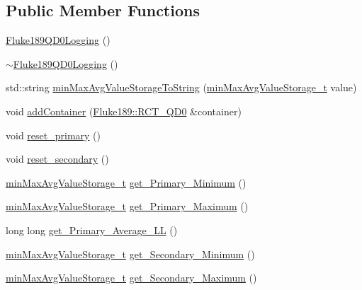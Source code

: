 \subsection*{Public Member Functions}
\begin{DoxyCompactItemize}
\item 
\hyperlink{classFluke_1_1Fluke189QD0Logging_ab856daf79c71ace0841c10c9f9b8f9e6}{Fluke189QD0Logging} ()
\item 
\hyperlink{classFluke_1_1Fluke189QD0Logging_ac134feed3bec91193ba7ffd119f9833d}{$\sim$Fluke189QD0Logging} ()
\item 
std::string \hyperlink{classFluke_1_1Fluke189QD0Logging_a328f1e4b632082f62d461fd4ba6eb838}{minMaxAvgValueStorageToString} (\hyperlink{structFluke_1_1Fluke189QD0Logging_1_1minMaxAvgValueStorage__t}{minMaxAvgValueStorage\_\-t} value)
\item 
void \hyperlink{classFluke_1_1Fluke189QD0Logging_af06d4058c124e5b13893311145d529d2}{addContainer} (\hyperlink{classFluke_1_1Fluke189_a9a5b405bb506cd2482de2f8bb0bea189}{Fluke189::RCT\_\-QD0} \&container)
\item 
void \hyperlink{classFluke_1_1Fluke189QD0Logging_a610c90f3ad529040eaf5aeb7195fe1bd}{reset\_\-primary} ()
\item 
void \hyperlink{classFluke_1_1Fluke189QD0Logging_ac5205e2183bdfffcd46229b71baeb3fb}{reset\_\-secondary} ()
\item 
\hyperlink{structFluke_1_1Fluke189QD0Logging_1_1minMaxAvgValueStorage__t}{minMaxAvgValueStorage\_\-t} \hyperlink{classFluke_1_1Fluke189QD0Logging_a61180ec1e3f4ffc507c5cc92bfa61952}{get\_\-Primary\_\-Minimum} ()
\item 
\hyperlink{structFluke_1_1Fluke189QD0Logging_1_1minMaxAvgValueStorage__t}{minMaxAvgValueStorage\_\-t} \hyperlink{classFluke_1_1Fluke189QD0Logging_a7da9ac7b5617e427cdfc1b09d6bd4373}{get\_\-Primary\_\-Maximum} ()
\item 
long long \hyperlink{classFluke_1_1Fluke189QD0Logging_a29473a5a7d016d020f0948fcf3e31e50}{get\_\-Primary\_\-Average\_\-LL} ()
\item 
\hyperlink{structFluke_1_1Fluke189QD0Logging_1_1minMaxAvgValueStorage__t}{minMaxAvgValueStorage\_\-t} \hyperlink{classFluke_1_1Fluke189QD0Logging_a447e04b2f508cb4a821c2842b96115ae}{get\_\-Secondary\_\-Minimum} ()
\item 
\hyperlink{structFluke_1_1Fluke189QD0Logging_1_1minMaxAvgValueStorage__t}{minMaxAvgValueStorage\_\-t} \hyperlink{classFluke_1_1Fluke189QD0Logging_a368a2503ede00bd9ef45937fc76278ea}{get\_\-Secondary\_\-Maximum} ()

\end{DoxyCompactItemize}
